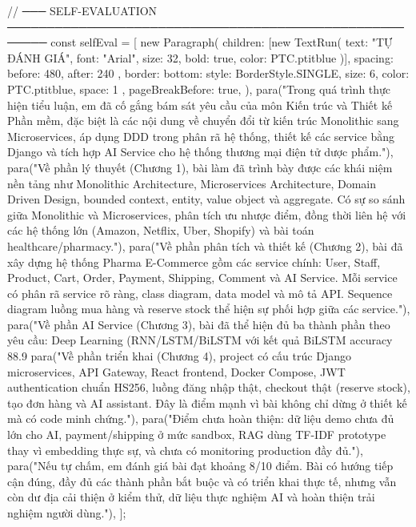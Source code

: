 {{{// ─── SELF-EVALUATION ───────────────────────────────────────────────────────
const selfEval = [
  new Paragraph({
    children: [new TextRun({ text: "TỰ ĐÁNH GIÁ", font: "Arial", size: 32, bold: true, color: PTC.ptitblue })],
    spacing: { before: 480, after: 240 },
    border: { bottom: { style: BorderStyle.SINGLE, size: 6, color: PTC.ptitblue, space: 1 } },
    pageBreakBefore: true,
  }),
  para("Trong quá trình thực hiện tiểu luận, em đã cố gắng bám sát yêu cầu của môn Kiến trúc và Thiết kế Phần mềm, đặc biệt là các nội dung về chuyển đổi từ kiến trúc Monolithic sang Microservices, áp dụng DDD trong phân rã hệ thống, thiết kế các service bằng Django và tích hợp AI Service cho hệ thống thương mại điện tử dược phẩm."),
  para("Về phần lý thuyết (Chương 1), bài làm đã trình bày được các khái niệm nền tảng như Monolithic Architecture, Microservices Architecture, Domain Driven Design, bounded context, entity, value object và aggregate. Có sự so sánh giữa Monolithic và Microservices, phân tích ưu nhược điểm, đồng thời liên hệ với các hệ thống lớn (Amazon, Netflix, Uber, Shopify) và bài toán healthcare/pharmacy."),
  para("Về phần phân tích và thiết kế (Chương 2), bài đã xây dựng hệ thống Pharma E-Commerce gồm các service chính: User, Staff, Product, Cart, Order, Payment, Shipping, Comment và AI Service. Mỗi service có phân rã service rõ ràng, class diagram, data model và mô tả API. Sequence diagram luồng mua hàng và reserve stock thể hiện sự phối hợp giữa các service."),
  para("Về phần AI Service (Chương 3), bài đã thể hiện đủ ba thành phần theo yêu cầu: Deep Learning (RNN/LSTM/BiLSTM với kết quả BiLSTM accuracy 88.9%
  para("Về phần triển khai (Chương 4), project có cấu trúc Django microservices, API Gateway, React frontend, Docker Compose, JWT authentication chuẩn HS256, luồng đăng nhập thật, checkout thật (reserve stock), tạo đơn hàng và AI assistant. Đây là điểm mạnh vì bài không chỉ dừng ở thiết kế mà có code minh chứng."),
  para("Điểm chưa hoàn thiện: dữ liệu demo chưa đủ lớn cho AI, payment/shipping ở mức sandbox, RAG dùng TF-IDF prototype thay vì embedding thực sự, và chưa có monitoring production đầy đủ."),
  para("Nếu tự chấm, em đánh giá bài đạt khoảng 8/10 điểm. Bài có hướng tiếp cận đúng, đầy đủ các thành phần bắt buộc và có triển khai thực tế, nhưng vẫn còn dư địa cải thiện ở kiểm thử, dữ liệu thực nghiệm AI và hoàn thiện trải nghiệm người dùng."),
];

}}}
